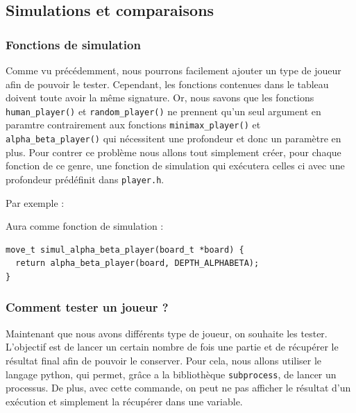 \documentclass{report}
\begin{document}
\subsection{Simulations et comparaisons}

\subsubsection{Fonctions de simulation}

Comme vu précédemment, nous pourrons facilement ajouter un type de joueur afin de pouvoir le tester. Cependant, les fonctions contenues dans le tableau doivent toute avoir la même signature. Or, nous savons que les fonctions \texttt{human\_player()} et \texttt{random\_player()} ne prennent qu'un seul argument en paramtre contrairement aux fonctions \texttt{minimax\_player()} et \texttt{alpha\_beta\_player()} qui nécessitent une profondeur et donc un paramètre en plus. Pour contrer ce problème nous allons tout simplement créer, pour chaque fonction de ce genre, une fonction de simulation qui exécutera celles ci avec une profondeur prédéfinit dans \texttt{player.h}. \newline

Par exemple :
\begin{center}
\end{center}

Aura comme fonction de simulation :

\begin{lstlisting}
move_t simul_alpha_beta_player(board_t *board) {
  return alpha_beta_player(board, DEPTH_ALPHABETA);
}
\end{lstlisting}

\subsubsection{Comment tester un joueur ?}

Maintenant que nous avons différents type de joueur, on souhaite les tester. L'objectif est de lancer un certain nombre de fois une partie et de récupérer le résultat final afin de pouvoir le conserver.
Pour cela, nous allons utiliser le langage python, qui permet, grâce a la bibliothèque \texttt{subprocess}, de lancer un processus. De plus, avec cette commande, on peut ne pas afficher le résultat d'un exécution et simplement la récupérer dans une variable.\newline
\end{document}
